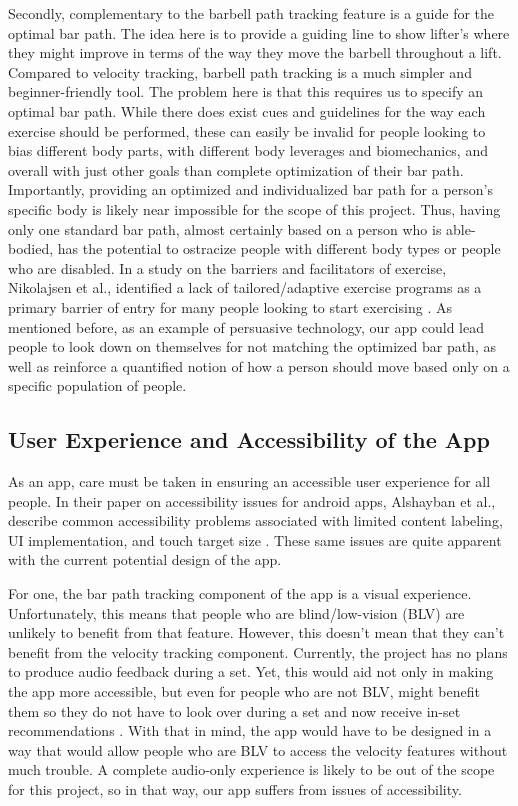 \documentclass[10pt,twocolumn]{article}
\begin{document}
Secondly, complementary to the barbell path tracking feature is a guide for the optimal bar path. The idea here is to provide a guiding line to show lifter's where they might improve in terms of the way they move the barbell throughout a lift. Compared to velocity tracking, barbell path tracking is a much simpler and beginner-friendly tool. The problem here is that this requires us to specify an optimal bar path. While there does exist cues and guidelines for the way each exercise should be performed, these can easily be invalid for people looking to bias different body parts, with different body leverages and biomechanics, and overall with just other goals than complete optimization of their bar path. Importantly, providing an optimized and individualized bar path for a person's specific body is likely near impossible for the scope of this project. Thus, having only one standard bar path, almost certainly based on a person who is able-bodied, has the potential to ostracize people with different body types or people who are disabled. In a study on the barriers and facilitators of exercise, Nikolajsen et al., identified a lack of tailored/adaptive exercise programs as a primary barrier of entry for many people looking to start exercising \cite{Nikolajsen2021}. As mentioned before, as an example of persuasive technology, our app could lead people to look down on themselves for not matching the optimized bar path, as well as reinforce a quantified notion of how a person should move based only on a specific population of people. \par

\subsection{User Experience and Accessibility of the App}
As an app, care must be taken in ensuring an accessible user experience for all people. In their paper on accessibility issues for android apps, Alshayban et al., describe common accessibility problems associated with limited content labeling, UI implementation, and touch target size \cite{Alshayban2020}. These same issues are quite apparent with the current potential design of the app. \par

For one, the bar path tracking component of the app is a visual experience. Unfortunately, this means that people who are blind/low-vision (BLV) are unlikely to benefit from that feature. However, this doesn't mean that they can't benefit from the velocity tracking component. Currently, the project has no plans to produce audio feedback during a set. Yet, this would aid not only in making the app more accessible, but even for people who are not BLV, might benefit them so they do not have to look over during a set and now receive in-set recommendations \cite{Dorrell2020}. With that in mind, the app would have to be designed in a way that would allow people who are BLV to access the velocity features without much trouble. A complete audio-only experience is likely to be out of the scope for this project, so in that way, our app suffers from issues of accessibility. \par
\end{document}

